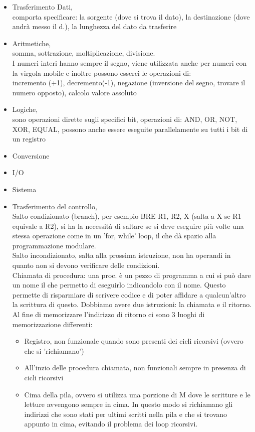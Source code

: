 \documentclass[arch.tex]{subfiles}
\begin{document}
\begin{itemize}
	\item Trasferimento Dati,\\
		comporta specificare: la sorgente (dove si trova il dato), la destinazione (dove andrà messo il d.),
		la lunghezza del dato da trasferire
	\item Aritmetiche,\\
		somma, sottrazione, moltiplicazione, divisione.\\
		I numeri interi hanno sempre il segno, viene utilizzata anche per numeri con la virgola mobile e inoltre
		possono esserci le operazioni di:\\
		incremento (+1), decremento(-1), negazione (inversione del segno, trovare il numero opposto), calcolo valore 
		assoluto
	\item Logiche,\\
		sono operazioni dirette sugli specifici bit, operazioni di: AND, OR, NOT, XOR, EQUAL,
		possono anche essere eseguite parallelamente su tutti i bit di un registro
	\item Conversione
	\item I/O
	\item Sistema
	\item Trasferimento del controllo,\\
		Salto condizionato (branch), per esempio BRE R1, R2, X (salta a X se R1 equivale a R2),
		si ha la necessità di saltare se si deve eseguire più volte una stessa operazione come in 
		un 'for, while' loop, il che dà spazio alla programmazione modulare.\\
		Salto incondizionato, salta alla prossima istruzione, non ha operandi in quanto non si devono verificare 
		delle condizioni.\\
		Chiamata di procedura: una proc. è un pezzo di programma a cui si può dare un nome il che permetto di eseguirlo
		indicandolo con il nome. Questo permette di risparmiare di scrivere codice e di poter affidare a qualcun'altro 
		la scrittura di questo. Dobbiamo avere due istruzioni: la chiamata e il ritorno.\\
		Al fine di memorizzare l'indirizzo di ritorno ci sono 3 luoghi di memorizzazione differenti:

		\begin{itemize}
			\item Registro, non funzionale quando sono presenti dei cicli ricorsivi (ovvero che si 'richiamano')
			\item All'inzio delle procedura chiamata, non funzionali sempre in presenza di cicli ricorsivi
			\item Cima della pila, ovvero si utilizza una porzione di M dove le scritture e le letture
				avvengono sempre in cima. In questo modo si richiamano gli indirizzi che sono stati per ultimi scritti
				nella pila e che si trovano appunto in cima, evitando il problema dei loop ricorsivi.
		\end{itemize}
	\end{itemize}
\end{document}

